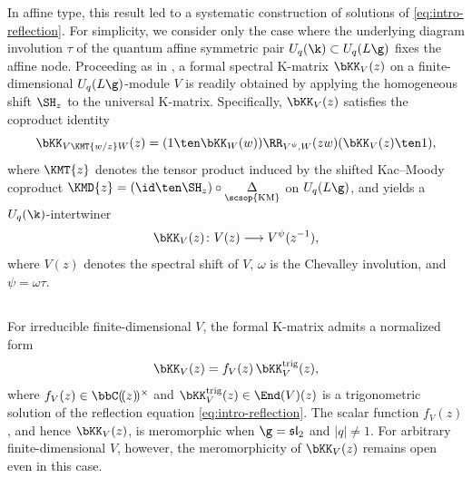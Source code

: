 \documentclass[reqno]{amsart}
\numberwithin{equation}{section}
\begin{document}
In affine type, this result led to a systematic construction of solutions of \eqref{eq:intro-reflection}.
For simplicity, we consider only the case where the underlying diagram involution $\tau$ of the quantum affine symmetric pair $U_q(\k)\subset U_q(L\g)$ fixes the affine node.
Proceeding as in \cite{drinfeld-quantum-groups-87}, a formal spectral K-matrix $\bKK_V(z)$
on	a finite-dimensional $U_q(L\g)$-module $V$ is readily obtained by applying the homogeneous shift $\SH_z$ to the universal K-matrix.
Specifically, $\bKK_V(z)$ satisfies the coproduct identity
	\begin{equation}\label{eq:intro-KM-coproduct}
	\bKK_{V{\KMT{w/z}}W}(z)
	=(1\ten\bKK_W(w))\RR_{V^\psi,W}(zw)(\bKK_V(z)\ten1),
\end{equation}
where ${\KMT{z}}$ denotes the tensor product
induced by the shifted Kac--Moody coproduct $\KMD{z}=(\id\ten\SH_z)\circ{\underset{\scsop{\mathrm{KM}}}{\Delta}}$
on $U_q(L\g)$,
and yields a $U_q(\k)$-intertwiner
\begin{equation}\label{eq:intro-KM-intertwiner}
	\bKK_V(z)\colon V(z)
	\longrightarrow V^\psi(z^{-1}),
\end{equation}
where $V(z)$ denotes the spectral shift of $V$, $\omega$ is the Chevalley involution, and $\psi=\omega\tau$.

\subsection{}
For irreducible finite-dimensional $V$, the formal K-matrix admits a normalized form
\begin{equation}\label{eq:intro-trigonometric-normalization}
	\bKK_V(z)=f_V(z)\,\bKK_V^{\mathrm{trig}}(z),
\end{equation}
where $f_V(z)\in\bbC(\negthinspace(z)\negthinspace)^\times$ and
$\bKK_V^{\mathrm{trig}}(z)\in\End(V)(z)$ is a trigonometric solution of
the reflection equation \eqref{eq:intro-reflection}.
The scalar function $f_V(z)$, and hence $\bKK_V(z)$, is meromorphic when $\g=\mathfrak{sl}_2$ and $|q|\neq1$.
For arbitrary finite-dimensional $V$, however, the meromorphicity of $\bKK_V(z)$ remains open even in this case.\\
\end{document}
